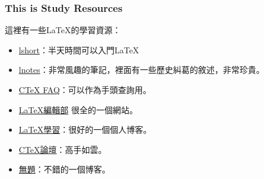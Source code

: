 \documentclass[a4paper, 12pt, titlepage]{article}
\begin{document}
\subsubsection{This is Study Resources}
這裡有一些\LaTeX 的學習資源：

\begin{itemize}
\item \href{http://tobi.oetiker.ch/lshort/lshort.pdf}{lshort}：半天時間可以入門\LaTeX
\item \href{http://www.ctan.org/get/info/lnotes/lnotes.pdf}{lnotes}：非常風趣的筆記，裡面有一些歷史糾葛的敘述，非常珍貴。
\item \href{http://www.ctex.org/CTeXFAQ}{CTeX FAQ}：可以作為手頭查詢用。
\item \href{http://zzg34b.w3.c361.com/index.htm}{\LaTeX 編輯部} 很全的一個網站。
\item \href{http://latex.yo2.cn/}{\LaTeX 學習}：很好的一個個人博客。
\item \href{http://bbs.ctex.org/}{CTeX論壇}：高手如雲。
\item \href{http://cohomo.blogbus.com/}{無題}：不錯的一個博客。
\end{itemize}



\end{document}
